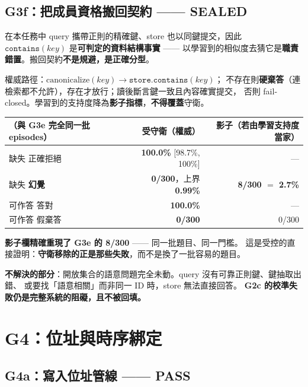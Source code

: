 \documentclass[11pt, a4paper]{article}
\newcommand{\PASS}{\textcolor{green!45!black}{\textbf{PASS}}}
\newcommand{\SEALED}{\textcolor{blue!60!black}{\textbf{SEALED}}}
\begin{document}
\subsection{G3f：把成員資格搬回契約 —— \SEALED{}}

在本任務中 query 攜帶正則的精確鍵、store 也以同鍵提交，因此
$\texttt{contains}(key)$ 是\textbf{可判定的資料結構事實} ——
以學習到的相似度去猜它是\textbf{職責錯置}。搬回契約\textbf{不是規避，是正確分型}。

權威路徑：$\text{canonicalize}(key) \to \texttt{store.contains}(key)$；
不存在則\textbf{硬棄答}（連檢索都不允許），存在才放行；讀後斷言鍵一致且內容確實提交，
否則 fail-closed。學習到的支持度降為\textbf{影子指標}，\textbf{不得覆蓋}守衛。

\begin{table}[h]
\centering
\small
\begin{tabular}{lrr}
\toprule
（與 G3e \textbf{完全同一批} episodes）& \textbf{受守衛（權威）} & \textbf{影子（若由學習支持度當家）} \\
\midrule
缺失 正確拒絕 & \textbf{100.0\%} [98.7\%, 100\%] & --- \\
缺失 \textbf{幻覺} & \textbf{0/300}，上界 \textbf{0.99\%} & \textbf{8/300 $=$ 2.7\%} \\
可作答 答對 & \textbf{100.0\%} & --- \\
可作答 假棄答 & \textbf{0/300} & 0/300 \\
\bottomrule
\end{tabular}
\end{table}

\textbf{影子欄精確重現了 G3e 的 8/300} —— 同一批題目、同一門檻。
這是受控的直接證明：\textbf{守衛移除的正是那些失敗}，而不是換了一批容易的題目。

\textbf{不解決的部分}：開放集合的語意問題完全未動。query 沒有可靠正則鍵、鍵抽取出錯、
或要找「語意相關」而非同一 ID 時，store 無法直接回答。
\textbf{G2c 的校準失敗仍是完整系統的阻礙，且不被回填。}

\section{G4：位址與時序綁定}

\subsection{G4a：寫入位址管線 —— \PASS{}}
\end{document}
